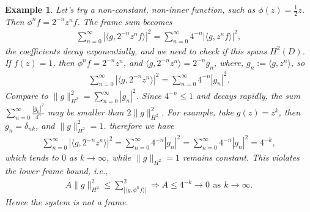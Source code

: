 \documentclass[12pt,titlepage]{amsart}
\newtheorem{exam}[thm]{Example}
\theoremstyle{definition}
\theoremstyle{remark}
\begin{document}
\begin{exam}
Let's try a non-constant, non-inner function, such as $\phi(z) =
\frac{1}{2}z$. Then $\phi^n f = 2^{-n} z^n f$. The frame sum
becomes
\begin{eqnarray*}
\sum_{n=0}^\infty |\langle g, 2^{-n} z^n f \rangle|^2 =
\sum_{n=0}^\infty 4^{-n} |\langle g, z^n f \rangle|^2,
\end{eqnarray*}
the coefficients decay exponentially, and we need to check if this
spans $H^2(D)$. If $f(z) = 1$, then $\phi^n f = 2^{-n} z^n$, and
$\langle g, 2^{-n} z^n \rangle = 2^{-n}g_n$, where, $g_n:=\langle
g, z^n \rangle$, so
\begin{eqnarray*}
\sum_{n=0}^\infty |\langle g, 2^{-n} z^n \rangle|^2 =
\sum_{n=0}^\infty 4^{-n} |g_n|^2 .
\end{eqnarray*}
Compare to $\|g\|_{H^2}^2 = \sum_{n=0}^\infty |g_n|^2$. Since
${4^{-n}} \leq 1$ and decays rapidly, the sum $\sum_{n=0}^{\infty}
\frac{|g_n|^2}{4^n}$ may be smaller than $2\|g\|_{H^2}^2$. For
example, take $g(z) = z^k$, then $g_n=\delta_{nk}$, and
$\|g\|_{H^2}^2=1$. therefore we have
\begin{eqnarray*}
\sum_{n=0}^\infty |\langle g, 2^{-n} z^n \rangle|^2 =
\sum_{n=0}^\infty 4^{-n} |g_n|^2=\sum_{n=0}^\infty 4^{-n}|g_n|^2=
4^{-k},
\end{eqnarray*}
which tends to $0$ as $k\rightarrow \infty$, while $\|g\|_{H^2}=1$
remains constant. This violates the lower frame bound, i.e.,
\begin{eqnarray*}
A \|g\|_{H^2}^2 \leq \sum_|\langle g, \phi^n f\rangle|^2
\Rightarrow A\leq 4^{-k}\rightarrow 0 \,\ \mbox{as} \,\
k\rightarrow \infty.
\end{eqnarray*}
Hence the system is not a frame.
\end{exam}
\end{document}
